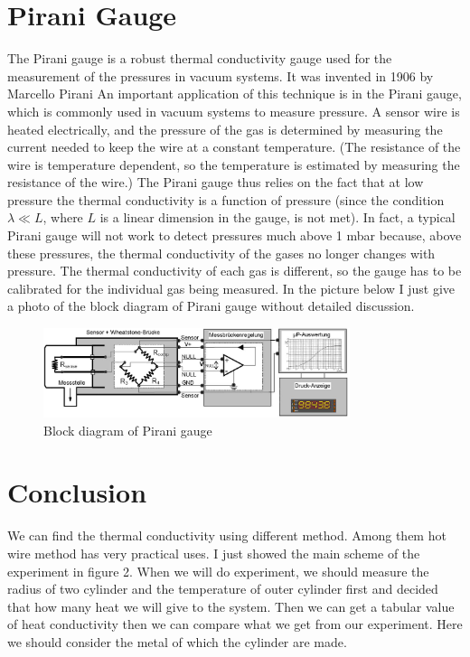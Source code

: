 \documentclass[a4paper, 12pt]{article}%
\begin{document}
\section{Pirani Gauge} The Pirani gauge is a robust thermal conductivity gauge used for the measurement of the pressures in vacuum systems. It was invented in 1906 by Marcello Pirani An important application of this technique is in the Pirani gauge, which is commonly used in vacuum systems to measure pressure. A sensor wire is heated electrically, and the pressure of the gas is determined by measuring the current needed to keep the wire at a constant temperature. (The resistance of the wire is temperature dependent, so the temperature is estimated by measuring the resistance of the wire.) The Pirani gauge thus relies on the fact that at low pressure the thermal conductivity is a function of pressure (since the condition $\lambda \ll L$, where $L$ is a linear dimension in the gauge, is not met). In fact, a typical Pirani gauge will not work to detect pressures much above 1 mbar because, above these pressures, the thermal conductivity of the gases no longer changes with pressure. The thermal conductivity of each gas is different, so the gauge has to be calibrated for the individual gas being measured. In the picture below I just give a photo of the block diagram of Pirani gauge without detailed discussion. 
\begin{figure}[h]
\begin{center}
\includegraphics[width = 0.8\textwidth]{B2.png}
\caption{Block diagram of Pirani gauge}
\end{center}
\end{figure}
\newpage
\section{Conclusion} 
We can find the thermal conductivity using different method. Among them hot wire method has very practical uses. I just showed the main scheme of the experiment in figure 2. When we will do experiment, we should measure the radius of two cylinder and the temperature of outer cylinder first and decided that how many heat we will give to the system. Then we can get a tabular value of heat conductivity then we can compare what we get from our experiment. Here we should consider the metal of which the cylinder are made. 
\end{document}
